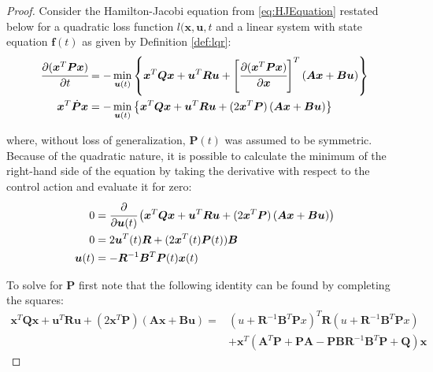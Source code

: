 \documentclass[a4paper,11pt]{book}
\numberwithin{figure}{chapter}
\numberwithin{equation}{chapter}
\numberwithin{table}{chapter}
\theoremstyle{definition}
\begin{document}
\begin{proof}
	Consider the Hamilton-Jacobi equation from \eqref{eq:HJEquation} restated below for a quadratic loss function $l(\bm{x}, \bm{u}, t$ and a linear system with state equation $\bm{f}(t)$ as given by Definition \ref{def:lqr}:
	\begin{equation}
	\begin{split}
		\cfrac{\partial (\bm{x}^T \bm{P} \bm{x})}{\partial t} &=  - \min_{\bm{u}(t)} \left\{ \bm{x}^T \bm{Q} \bm{x} + \bm{u}^T \bm{R} \bm{u} + \left[ \cfrac{\partial (\bm{x}^T \bm{P} \bm{x})}{\partial \bm{x}} \right]^T \left( \bm{A} \bm{x} + \bm{B} \bm{u} \right) \right\} \\
		\bm{x}^T \dot{\bm{P}} \bm{x} &= - \min_{\bm{u}(t)} \left\{ \bm{x}^T \bm{Q} \bm{x} + \bm{u}^T \bm{R} \bm{u} + (2 \bm{x}^T \bm{P}) \left( \bm{A} \bm{x} + \bm{B} \bm{u} \right) \right\}
	\end{split}
	\end{equation}
	
	\noindent where, without loss of generalization, $\bm{P}(t)$ was assumed to be symmetric. Because of the quadratic nature, it is possible to calculate the minimum of the right-hand side of the equation by taking the derivative with respect to the control action and evaluate it for zero:
	\begin{equation}
	\begin{split}
		0 &= \cfrac{\partial}{\partial \bm{u}(t)} \left( \bm{x}^T \bm{Q} \bm{x} + \bm{u}^T \bm{R} \bm{u} + (2 \bm{x}^T \bm{P}) \left( \bm{A} \bm{x} + \bm{B} \bm{u} \right) \right) \\
		0 &= 2 \bm{u}^T(t) \bm{R} + (2 \bm{x}^T(t) \bm{P}(t)) \bm{B} \\
		\bm{u}(t) &= - \bm{R}^{-1}  \bm{B}^T \bm{P}(t) \bm{x}(t)
	\end{split}
	\end{equation}
	
	To solve for $\bm{P}$ first note that the following identity can be found by completing the squares:
	\begin{equation}
	\begin{split}
		\bm{x}^T \bm{Q} \bm{x} + \bm{u}^T \bm{R} \bm{u} + (2 \bm{x}^T \bm{P}) \left( \bm{A} \bm{x} + \bm{B} \bm{u} \right) = & (u + \bm{R}^{-1} \bm{B}^T \bm{P} x)^T \bm{R} (u + \bm{R}^{-1} \bm{B}^T \bm{P} x) \\ & + \bm{x}^T (\bm{A}^T \bm{P} + \bm{P} \bm{A} - \bm{P} \bm{B} \bm{R}^{-1} \bm{B}^T \bm{P} + \bm{Q}) \bm{x}
	\end{split}
	\end{equation}
	

\end{proof}
\end{document}
